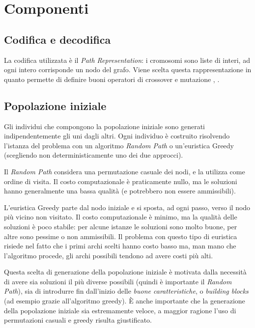 \documentclass[a4paper, 10pt]{report}
\begin{document}
\section{Componenti}
\label{sec:ga_components}

\subsection{Codifica e decodifica}
La codifica utilizzata è il \emph{Path Representation}: i cromosomi sono
liste di interi, ad ogni intero corrisponde un nodo del grafo. Viene scelta
questa rappresentazione in quanto permette di definire buoni operatori di
crossover e mutazione \cite[Abdoun et al.]{abdoun2012},
\cite[Chatterjee]{chatterjee1996}.

\subsection{Popolazione iniziale}
Gli individui che compongono la popolazione iniziale sono generati
indipendentemente gli uni dagli altri. Ogni individuo è costruito risolvendo
l'istanza del problema con un algoritmo \emph{Random Path} o un'euristica
Greedy (scegliendo non deterministicamente uno dei due approcci).

Il \emph{Random Path} considera una permutazione casuale dei nodi, e la
utilizza come ordine di visita. Il costo computazionale è praticamente nullo,
ma le soluzioni hanno generalmente una bassa qualità (e potrebbero non essere
ammissibili).

L'euristica Greedy parte dal nodo iniziale e si sposta, ad ogni passo, verso
il nodo più vicino non visitato. Il costo computazionale è minimo, ma la qualità
delle soluzioni è poco stabile: per alcune istanze le soluzioni sono molto
buone, per altre sono pessime o non ammissibili. Il problema con questo tipo
di euristica risiede nel fatto che i primi archi scelti hanno costo basso ma,
man mano che l'algoritmo procede, gli archi possibili tendono ad avere costi
più alti.

Questa scelta di generazione della popolazione iniziale è motivata dalla
necessità di avere sia soluzioni il più diverse possibili (quindi è importante
il \emph{Random Path}), sia di introdurre fin dall'inizio delle \emph{buone
caratteristiche}, o \emph{building blocks} (ad esempio grazie all'algoritmo
greedy). È anche importante che la generazione della popolazione iniziale sia
estremamente veloce, a maggior ragione l'uso di permutazioni casuali e greedy
risulta giustificato.
\end{document}
